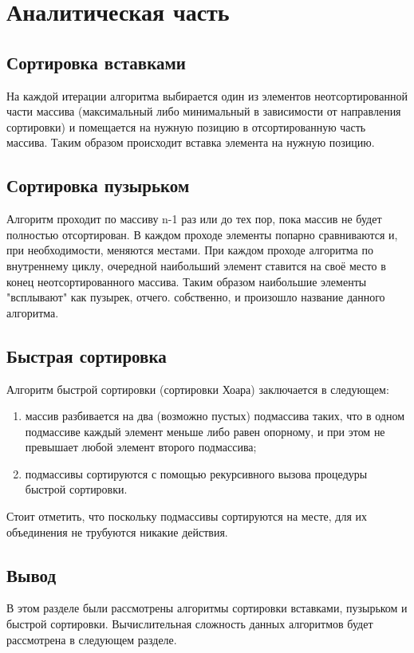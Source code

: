 \chapter{Аналитическая часть}

\section{Сортировка вставками}

На каждой итерации алгоритма выбирается один из элементов неотсортированной части массива (максимальный либо минимальный  в зависимости от направления сортировки) 
и помещается на нужную позицию в отсортированную часть массива. \cite{Cormen} Таким образом происходит вставка элемента на нужную позицию.



\section{Сортировка пузырьком}

Алгоритм проходит по массиву n-1 раз или до тех пор, пока массив не будет полностью отсортирован. 
В каждом проходе элементы попарно сравниваются и, при необходимости, меняются местами.
При каждом проходе алгоритма по внутреннему циклу, очередной наибольший элемент ставится на своё место в конец неотсортированного массива. \cite{Cormen}
Таким образом наибольшие элементы "всплывают" как пузырек, отчего. собственно, и произошло название данного алгоритма. 



\section{Быстрая сортировка}

Алгоритм быстрой сортировки (сортировки Хоара) заключается в следующем:
\begin{enumerate}
	\item массив разбивается на два (возможно пустых) подмассива таких, что в одном подмассиве каждый элемент меньше либо равен опорному, 
	и при этом не превышает любой элемент второго подмассива;
	\item подмассивы сортируются с помощью рекурсивного вызова процедуры быстрой сортировки.
\end{enumerate} 

Стоит отметить, что поскольку подмассивы сортируются на месте, для их объединения не трубуются никакие действия. \cite{Cormen}



\section*{Вывод}
В этом разделе были рассмотрены алгоритмы сортировки вставками, пузырьком и быстрой сортировки. Вычислительная сложность данных алгоритмов будет рассмотрена в следующем разделе.
